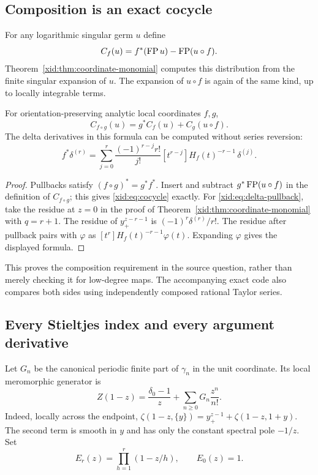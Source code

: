 \subsection{Composition is an exact cocycle}

For any logarithmic singular germ $u$ define
\[
 C_f(u)=f^*(\operatorname{FP} u)-\operatorname{FP}(u\circ f).
\]
Theorem~\ref{xid:thm:coordinate-monomial} computes this distribution from the
finite singular expansion of $u$.  The expansion of $u\circ f$ is
again of the same kind, up to locally integrable terms.

\begin{theorem}
\label{xid:thm:cocycle}
For orientation-preserving analytic local coordinates $f,g$,
\begin{equation}\label{xid:eq:cocycle}
 C_{f\circ g}(u)=g^*C_f(u)+C_g(u\circ f).
\end{equation}
The delta derivatives in this formula can be computed without series
reversion:
\begin{equation}\label{xid:eq:delta-pullback}
 f^*\delta^{(r)}
 =\sum_{j=0}^r\frac{(-1)^{r-j}r!}{j!}
     [t^{r-j}]H_f(t)^{-r-1}\,\delta^{(j)}.
\end{equation}
\end{theorem}

\begin{proof}
Pullbacks satisfy $(f\circ g)^*=g^*f^*$.  Insert and subtract
$g^*\operatorname{FP}(u\circ f)$ in the definition of $C_{f\circ g}$; this gives
\eqref{xid:eq:cocycle} exactly.  For \eqref{xid:eq:delta-pullback}, take the
residue at $z=0$ in the proof of Theorem~\ref{xid:thm:coordinate-monomial}
with $q=r+1$.  The residue of $y_+^{z-r-1}$ is
$(-1)^r\delta^{(r)}/r!$.  The residue after pullback pairs with
$\varphi$ as $[t^r]H_f(t)^{-r-1}\varphi(t)$.
Expanding $\varphi$ gives the displayed formula.
\end{proof}

This proves the composition requirement in the source question, rather
than merely checking it for low-degree maps.  The accompanying exact
code also compares both sides using independently composed rational
Taylor series.

\subsection{Every Stieltjes index and every argument derivative}

Let $G_n$ be the canonical periodic finite part of $\gamma_n$ in the
unit coordinate.  Its local meromorphic generator is
\begin{equation}\label{xid:eq:periodic-G-local}
 Z(1-z)=\frac{\delta_0-1}{z}
          +\sum_{n\ge0}G_n\frac{z^n}{n!}.
\end{equation}
Indeed, locally across the endpoint,
$\zeta(1-z,\{y\})=y_+^{z-1}+\zeta(1-z,1+y)$.
The second term is smooth in $y$ and has only the constant spectral
pole $-1/z$.  Set
\begin{equation}\label{xid:eq:Er}
 E_r(z)=\prod_{h=1}^r(1-z/h),\qquad E_0(z)=1.
\end{equation}

